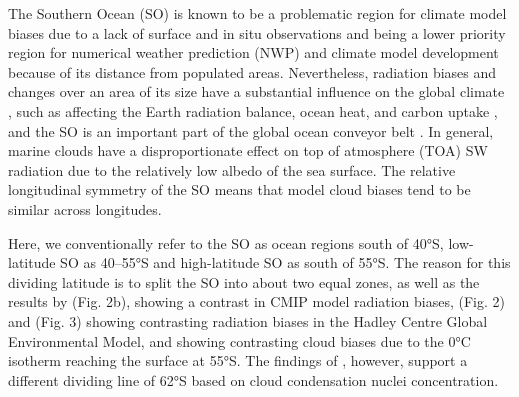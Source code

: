 \documentclass[draft]{agujournal2019}
\begin{document}
The Southern Ocean (SO) is known to be a problematic region for climate model biases  due to a lack of surface and in situ observations and being a lower priority region for numerical weather prediction (NWP) and climate model development because of its distance from populated areas. Nevertheless, radiation biases and changes over an area of its size have a substantial influence on the global climate , such as affecting the Earth radiation balance, ocean heat, and carbon uptake , and the SO is an important part of the global ocean conveyor belt . In general, marine clouds have a disproportionate effect on top of atmosphere (TOA) SW radiation due to the relatively low albedo of the sea surface. The relative longitudinal symmetry of the SO means that model cloud biases tend to be similar across longitudes.

Here, we conventionally refer to the SO as ocean regions south of 40°S, low-latitude SO as 40--55°S and high-latitude SO as south of 55°S. The reason for this dividing latitude is to split the SO into about two equal zones, as well as the results by  (Fig. 2b), showing a contrast in CMIP model radiation biases,  (Fig. 2) and  (Fig. 3) showing contrasting radiation biases in the Hadley Centre Global Environmental Model, and  showing contrasting cloud biases due to the 0°C isotherm reaching the surface at 55°S. The findings of , however, support a different dividing line of 62°S based on cloud condensation nuclei concentration.
\end{document}
